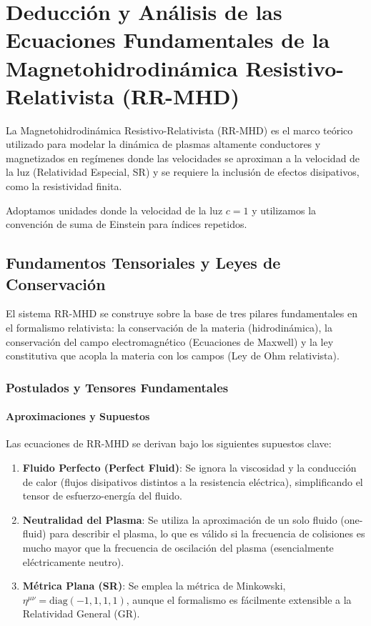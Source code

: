 
\section{Deducción y Análisis de las Ecuaciones Fundamentales de la Magnetohidrodinámica Resistivo-Relativista (RR-MHD)}

La Magnetohidrodinámica Resistivo-Relativista (RR-MHD) es el marco teórico utilizado para modelar la dinámica de plasmas altamente conductores y magnetizados en regímenes donde las velocidades se aproximan a la velocidad de la luz (Relatividad Especial, SR) y se requiere la inclusión de efectos disipativos, como la resistividad finita.

Adoptamos unidades donde la velocidad de la luz $c=1$ y utilizamos la convención de suma de Einstein para índices repetidos.

\subsection{Fundamentos Tensoriales y Leyes de Conservación}

El sistema RR-MHD se construye sobre la base de tres pilares fundamentales en el formalismo relativista: la conservación de la materia (hidrodinámica), la conservación del campo electromagnético (Ecuaciones de Maxwell) y la ley constitutiva que acopla la materia con los campos (Ley de Ohm relativista).

\subsubsection{Postulados y Tensores Fundamentales}

\paragraph{Aproximaciones y Supuestos}
Las ecuaciones de RR-MHD se derivan bajo los siguientes supuestos clave:
\begin{enumerate}
    \item \textbf{Fluido Perfecto (Perfect Fluid)}: Se ignora la viscosidad y la conducción de calor (flujos disipativos distintos a la resistencia eléctrica), simplificando el tensor de esfuerzo-energía del fluido.
    \item \textbf{Neutralidad del Plasma}: Se utiliza la aproximación de un solo fluido (one-fluid) para describir el plasma, lo que es válido si la frecuencia de colisiones es mucho mayor que la frecuencia de oscilación del plasma (esencialmente eléctricamente neutro).
    \item \textbf{Métrica Plana (SR)}: Se emplea la métrica de Minkowski, $\eta^{\mu\nu} = \text{diag}(-1, 1, 1, 1)$, aunque el formalismo es fácilmente extensible a la Relatividad General (GR).
\end{enumerate}

